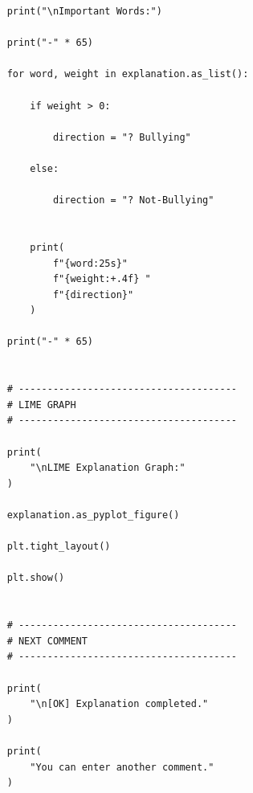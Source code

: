 \documentclass[11pt,a4paper]{article}
\begin{document}
\begin{lstlisting}
    print("\nImportant Words:")

    print("-" * 65)

    for word, weight in explanation.as_list():

        if weight > 0:

            direction = "? Bullying"

        else:

            direction = "? Not-Bullying"


        print(
            f"{word:25s}"
            f"{weight:+.4f} "
            f"{direction}"
        )

    print("-" * 65)


    # --------------------------------------
    # LIME GRAPH
    # --------------------------------------

    print(
        "\nLIME Explanation Graph:"
    )

    explanation.as_pyplot_figure()

    plt.tight_layout()

    plt.show()


    # --------------------------------------
    # NEXT COMMENT
    # --------------------------------------

    print(
        "\n[OK] Explanation completed."
    )

    print(
        "You can enter another comment."
    )
\end{lstlisting}
\end{document}
